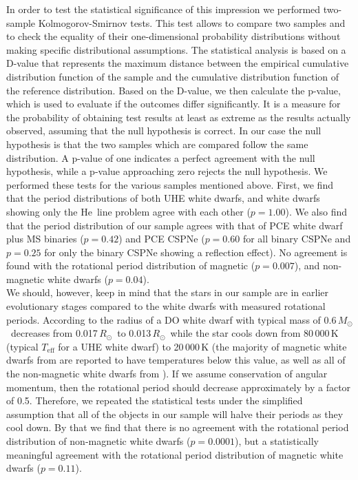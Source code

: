 \documentclass{aa}
\newcounter{Rco}
\newcommand{\Ionst}[1]{\setcounter{Rco}{#1}\Roman{Rco}}
\newcommand{\Ion}[2]{\mbox{#1\,{\scriptsize\Ionst{#2}}}}
\newcommand{\Teff}{\mbox{$T_\mathrm{eff}$}\xspace}
\newcommand{\Msol}{$M_\odot$}
\newcommand{\Rsol}{$R_\odot$}
\begin{document}
In order to test the statistical significance of this impression
we performed two-sample Kolmogorov-Smirnov tests. This test allows
to compare two samples and to check the equality of their one-dimensional
probability distributions without making specific distributional
assumptions. The statistical analysis is based on a D-value that represents
the maximum distance between the empirical cumulative
distribution function of the sample and the cumulative distribution
function of the reference distribution. Based on the D-value, we then calculate the
p-value, which is used to evaluate if the outcomes differ significantly.
It is a measure for the probability of obtaining test results at
least as extreme as the results actually observed, assuming that the null
hypothesis is correct. In our case the null hypothesis is that the
two samples which are compared follow the same distribution. A p-value
of one indicates a perfect agreement with the null hypothesis, while a
p-value approaching zero rejects the null hypothesis.
We performed these tests for the various samples mentioned above.
First, we find that the period distributions of both UHE white dwarfs,
and white dwarfs showing only the \Ion{He}{2} line problem agree with each
other ($p=1.00$). We also find that the period distribution of our sample
agrees with that of PCE white dwarf plus MS binaries ($p=0.42$) and
PCE CSPNe ($p=0.60$ for all binary CSPNe and $p=0.25$ for only the binary
CSPNe showing a reflection effect).
No agreement is found with the rotational period distribution of magnetic
($p=0.007$), and non-magnetic white dwarfs ($p=0.04$).\\
We should, however, keep in mind that the stars in our sample are in earlier
evolutionary stages compared to the white dwarfs with measured rotational
periods. According to \cite{Althaus+2009} the radius of a DO white dwarf with
typical mass of 0.6\,\Msol\ decreases from 0.017\,\Rsol\ to
0.013\,\Rsol\ while the star cools down from 80\,000\,K (typical \Teff for a
UHE white dwarf) to 20\,000\,K (the majority of magnetic
white dwarfs from \citealt{Ferrario+2015} are reported to have temperatures
below this value, as well as all of the non-magnetic white dwarfs from
\citealt{Kawaler2004, Hermes+2017}). If we assume conservation
of angular momentum, then the rotational period should
decrease approximately by a factor of 0.5.
Therefore, we repeated the statistical tests under the simplified assumption
that all of the objects in our sample will halve their periods
as they cool down. By that we find that there is no agreement with
the rotational period distribution of non-magnetic white dwarfs ($p=0.0001$), but
a statistically meaningful agreement with the rotational period distribution
of magnetic white dwarfs ($p=0.11$).
 
\end{document}
